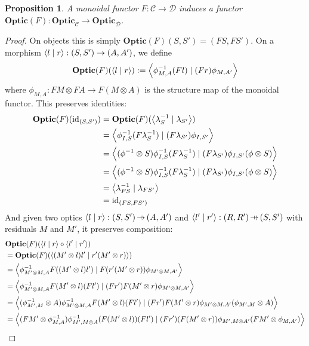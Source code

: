 \documentclass[11pt,letterpaper]{article}
\theoremstyle{plain}
\newtheorem{proposition}[theorem]{Proposition}
\theoremstyle{definition}
\newcommand{\C}{\mathscr{C}}
\newcommand{\D}{\mathscr{D}}
\newcommand{\Optic}{\mathbf{Optic}}
\newcommand{\id}{\mathrm{id}}
\newcommand{\rep}[2]{{\ensuremath \left\langle #1 \mid #2 \right\rangle}}
\newcommand{\hto}{\ensuremath{\,\mathaccent\shortmid\rightarrow\,}}
\begin{document}
\begin{proposition}\label{prop:change-of-action-monoidal}
  A monoidal functor $F : \C \to \D$ induces a functor $\Optic(F) : \Optic_\C \to \Optic_\D$.
\end{proposition}
\begin{proof}
  On objects this is simply $\Optic(F)(S, S') = (FS, FS')$. On a morphism $\rep{l}{r} : (S, S') \to (A, A')$, we define
  \begin{align*}
    \Optic(F)(\rep{l}{r}) := \rep{\phi^{-1}_{M,A} (Fl)}{(Fr) \phi_{M,A'}}
  \end{align*}
  where $\phi_{M,A} : FM \otimes FA \to F(M \otimes A)$ is the structure map of the monoidal functor.
  This preserves identities:
  \begin{align*}
  \Optic(F)(\id_{(S, S')})
  &= \Optic(F)(\rep{\lambda^{-1}_S}{\lambda_{S'}}) \\
  &= \rep{\phi^{-1}_{I,S} (F\lambda^{-1}_S)}{(F\lambda_{S'}) \phi_{I,S'}} \\
  &= \rep{(\phi^{-1} \otimes S) \phi^{-1}_{I,S} (F\lambda^{-1}_S)}{(F\lambda_{S'}) \phi_{I,S'}(\phi \otimes S) } \\
  &= \rep{(\phi^{-1} \otimes S) \phi^{-1}_{I,S} (F\lambda^{-1}_S)}{(F\lambda_{S'}) \phi_{I,S'}(\phi \otimes S) } \\
  &= \rep{\lambda^{-1}_{FS}}{\lambda_{FS'}} \\
  &= \id_{(FS, FS')}
  \end{align*}
  And given two optics $\rep{l}{r} : (S, S') \hto (A, A')$ and $\rep{l'}{r'} : (R, R') \hto (S, S')$ with residuals $M$ and $M'$, it preserves composition:
\begin{align*}
&\Optic(F)(\rep{l}{r} \circ \rep{l'}{r'})  \\
&= \Optic(F)(\rep{(M' \otimes l)l'}{r'(M' \otimes r)}) \\
&= \rep{\phi^{-1}_{M' \otimes M,A} F((M' \otimes l)l')}{F(r'(M' \otimes r)) \phi_{M' \otimes M,A'}} \\
&= \rep{\phi^{-1}_{M' \otimes M,A} F(M' \otimes l)(Fl')}{(Fr') F(M' \otimes r) \phi_{M' \otimes M,A'}} \\
&= \rep{(\phi^{-1}_{M', M} \otimes A)\phi^{-1}_{M' \otimes M,A} F(M' \otimes l)(Fl')}{(Fr') F(M' \otimes r) \phi_{M' \otimes M,A'}(\phi_{M', M} \otimes A)} \\
&= \rep{(FM' \otimes \phi^{-1}_{M,A})\phi^{-1}_{M',M \otimes A}(F(M' \otimes l)) (Fl')}{(Fr') (F(M' \otimes r)) \phi_{M',M \otimes A'}  (FM' \otimes \phi_{M,A'})} \\

\end{align*}
\end{proof}
\end{document}

